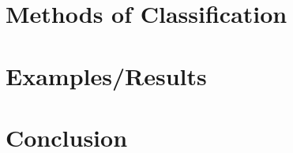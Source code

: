 \documentclass[midd]{thesis}
\begin{document}
\chapter{Methods of Classification}

\chapter{Examples/Results}

\chapter{Conclusion}


\appendix
\nocite{*}


\end{document}
